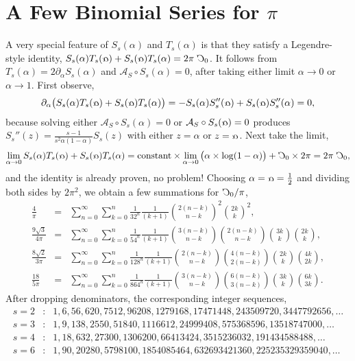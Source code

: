 \documentclass[nofootinbib,preprint]{revtex4-1}
\newcommand{\rev}[1]{\text{\reflectbox{$#1$}}}
\begin{document}
\section{A Few Binomial Series for $\pi$}
A very special feature of $S_s(\alpha)$ and $T_s(\alpha)$ is that they satisfy 
a Legendre-style identity, 
$S_s(\alpha)T_s(\rev{\alpha})+S_s(\rev{\alpha})T_s(\alpha)=2\pi\;\rev{C}_0$. 
It follows from $T_s(\alpha)=2\partial_{\alpha}S_s(\alpha)$ and 
$\mathcal{A}_S \circ S_s(\alpha)=0$, after taking either limit 
$\alpha \rightarrow 0$ or $\alpha \rightarrow 1$. First observe,
\begin{eqnarray}
 \partial_{\alpha}\big(S_s(\alpha)T_s(\rev{\alpha})+S_s(\rev{\alpha})T_s(\alpha)\big)=
 -S_s(\alpha) S_s''(\rev{\alpha})+S_s(\rev{\alpha})S_s''(\alpha) =  0, \nonumber
\end{eqnarray}
because solving either $\mathcal{A}_S \circ S_s(\alpha) = 0$ or 
$\mathcal{A}_S \circ S_s(\rev{\alpha})=0$ 
produces $S_s''(z)=\frac{s-1}{s^2\alpha(1-\alpha)}S_s(z)$ with 
either $z=\alpha$ or $z=\rev{\alpha}$. Next take the limit, 
\begin{eqnarray}
\lim_{\alpha \rightarrow 0} S_s(\alpha)T_s(\rev{\alpha})+S_s(\rev{\alpha})T_s(\alpha)
= \text{constant} \times \lim_{\alpha \rightarrow 0} \big( \alpha  
\times  \log(1-\alpha)  \big)
+ \rev{C}_0 \times 2 \pi = 2 \pi \; \rev{C}_0,  \nonumber 
\end{eqnarray}
and the identity is already proven, no problem! Choosing $\alpha=\rev{\alpha}=\frac{1}{2}$ 
and dividing both sides by $2\pi^2$, we obtain a few summations for $\rev{C}_0/\pi$,
\begin{eqnarray}
\frac{4}{\pi} &=& \sum_{n=0}^{\infty}\sum_{k=0}^{n}
\frac{1}{32^n}\frac{1}{(k+1)}\binom{2(n-k)}{n-k}^2\binom{2k}{k}^2, \nonumber \\
\frac{9\sqrt{3}}{4\pi} &=&  \sum_{n=0}^{\infty}\sum_{k=0}^{n}
\frac{1}{54^n}\frac{1}{(k+1)}\binom{3(n-k)}{n-k}\binom{2(n-k)}{n-k} \binom{3k}{k} \binom{2k}{k}, 
   \nonumber  \\
\frac{8\sqrt{2}}{3\pi} &=&  \sum_{n=0}^{\infty}\sum_{k=0}^{n}
\frac{1}{128^n}\frac{1}{(k+1)}\binom{2(n-k)}{n-k}\binom{4(n-k)}{2(n-k)} \binom{2k}{k} \binom{4k}{2k}, 
   \nonumber  \\
\frac{18}{5\pi} &=&  \sum_{n=0}^{\infty}\sum_{k=0}^{n}
\frac{1}{864^n}\frac{1}{(k+1)}\binom{3(n-k)}{n-k}\binom{6(n-k)}{3(n-k)} \binom{3k}{k} \binom{6k}{3k}. 
   \nonumber     
\end{eqnarray}
After dropping denominators, the corresponding integer sequences, 
\begin{eqnarray}
s=2 &:& 1, 6, 56, 620, 7512, 96208, 1279168, 17471448,243509720, 3447792656, \ldots  \nonumber  \\
s=3 &:& 1, 9, 138, 2550, 51840, 1116612, 24999408, 575368596,13518747000, \ldots  \nonumber  \\
s=4 &:& 1, 18, 632, 27300, 1306200, 66413424, 3515236032, 191434588488, \ldots  \nonumber  \\
s=6 &:& 1, 90, 20280, 5798100, 1854085464, 632693421360, 225235329359040, \ldots  \nonumber  
\end{eqnarray}
\end{document}
